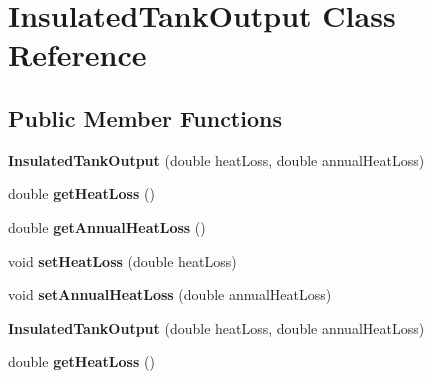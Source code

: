 \hypertarget{class_insulated_tank_output}{}\section{Insulated\+Tank\+Output Class Reference}
\label{class_insulated_tank_output}
\subsection*{Public Member Functions}
\begin{DoxyCompactItemize}
\item 
\mbox{\label{class_insulated_tank_output_a83fcbf8eb49d7bfd346882d92e21738a}} 
{\bfseries Insulated\+Tank\+Output} (double heat\+Loss, double annual\+Heat\+Loss)
\item 
\mbox{\label{class_insulated_tank_output_a99aff99468ba3edc7dd1eaabb1f77516}} 
double {\bfseries get\+Heat\+Loss} ()
\item 
\mbox{\label{class_insulated_tank_output_abcfec4ccd75cac48c2d5704bf3607f2e}} 
double {\bfseries get\+Annual\+Heat\+Loss} ()
\item 
\mbox{\label{class_insulated_tank_output_a45aff6f1036a0d45931c2e00212b6e30}} 
void {\bfseries set\+Heat\+Loss} (double heat\+Loss)
\item 
\mbox{\label{class_insulated_tank_output_a6430853b51b8a547f17a5e74300e6fb5}} 
void {\bfseries set\+Annual\+Heat\+Loss} (double annual\+Heat\+Loss)
\item 
\mbox{\label{class_insulated_tank_output_a83fcbf8eb49d7bfd346882d92e21738a}} 
{\bfseries Insulated\+Tank\+Output} (double heat\+Loss, double annual\+Heat\+Loss)
\item 
\mbox{\label{class_insulated_tank_output_a99aff99468ba3edc7dd1eaabb1f77516}} 
double {\bfseries get\+Heat\+Loss} ()
\item 
\mbox{\label{class_insulated_tank_output_abcfec4ccd75cac48c2d5704bf3607f2e}} 

\end{DoxyCompactItemize}
